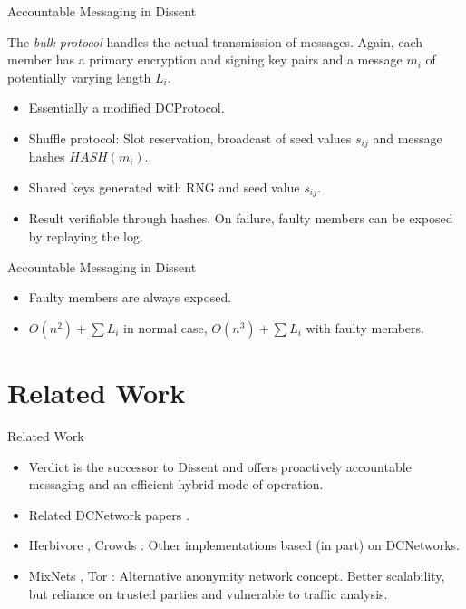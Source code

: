 \documentclass[]{beamer} %
\begin{document}

\begin{frame}{Accountable Messaging in Dissent}

The \emph{bulk protocol} handles the actual transmission of messages. Again, each member has
a primary encryption and signing key pairs and a message $m_i$ of potentially varying length
$L_i$. 

\begin{itemize}
\item Essentially a modified \ac{DCProtocol}.
\item Shuffle protocol: Slot reservation, broadcast of seed values $s_{ij}$
      and message hashes $HASH(m_i)$.
\item Shared keys generated with RNG and seed value $s_{ij}$.
\item Result verifiable through hashes. On failure, faulty members can be exposed
      by replaying the log. %
\end{itemize}

\end{frame}

\begin{frame}{Accountable Messaging in Dissent}

\begin{itemize}
\item Faulty members are always exposed.
\item $O(n^2) + \sum L_i$ in normal case, $O(n^3) + \sum L_i$ with faulty members.
\end{itemize}

\end{frame}

\section{Related Work}

\begin{frame}{Related Work}
\begin{itemize}
\item Verdict \cite{corrigan2013proactively} is the successor to Dissent and offers
      proactively accountable messaging and an efficient hybrid mode of operation.
\item Related \ac{DCNetwork} papers \cite{waidner1989dining,juels2004dining,bos1990detection}.
\item Herbivore \cite{goel2003herbivore}, Crowds \cite{reiter1998crowds}:
      Other implementations based (in part) on \acp{DCNetwork}.
\item \acp{MixNet} \cite{journals/cacm/Chaum81}, Tor \cite{conf/uss/DingledineMS04}:
      Alternative anonymity network concept. Better scalability,
      but reliance on trusted parties and vulnerable to traffic analysis.
\end{itemize}

\end{frame}
\end{document}
